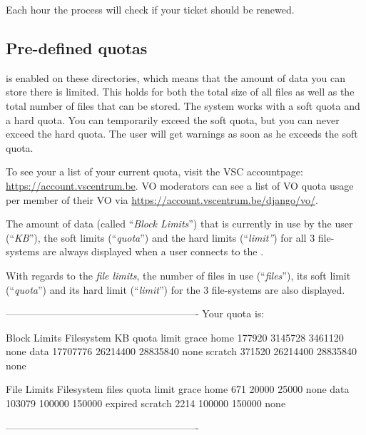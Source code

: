 Each hour the process will check if your ticket should be renewed.


\fi


\subsection{Pre-defined quotas}
\label{subsec:predfined-quotas}
\hypertarget{predefined-quotas}{}

 is enabled on these directories, which means that the amount of
data you can store there is limited. This holds for both the total size of all
files as well as the total number of files that can be stored. The system works
with a soft quota and a hard quota. You can temporarily exceed the soft quota,
but you can never exceed the hard quota. The user will get warnings as soon as
he exceeds the soft quota.


\ifgent
To see your a list of your current quota, visit the VSC accountpage: \url{https://account.vscentrum.be}.
VO moderators can see a list of VO quota usage per member of their VO via \url{https://account.vscentrum.be/django/vo/}.
\fi

\ifantwerpen
The amount of data (called ``\emph{Block Limits}'') that is currently in use
by the user (``\emph{KB}''), the soft limits (``\emph{quota}'') and the
hard limits (``\emph{limit''}) for all 3 file-systems are always displayed
when a user connects to the \hpc.

 With regards to the \emph{file limits}, the number of files in use
 (``\emph{files}''), its soft limit (``\emph{quota}'') and its hard limit
 (``\emph{limit}'') for the 3 file-systems are also displayed.

\begin{prompt}
----------------------------------------------------------
Your quota is:

                   Block Limits
   Filesystem         KB      quota      limit    grace
   home           177920    3145728    3461120     none
   data         17707776   26214400   28835840     none
   scratch        371520   26214400   28835840     none

                File Limits
   Filesystem      files      quota      limit    grace
   home              671      20000      25000     none
   data           103079     100000     150000  expired
   scratch          2214     100000     150000     none

----------------------------------------------------------
\end{prompt}

